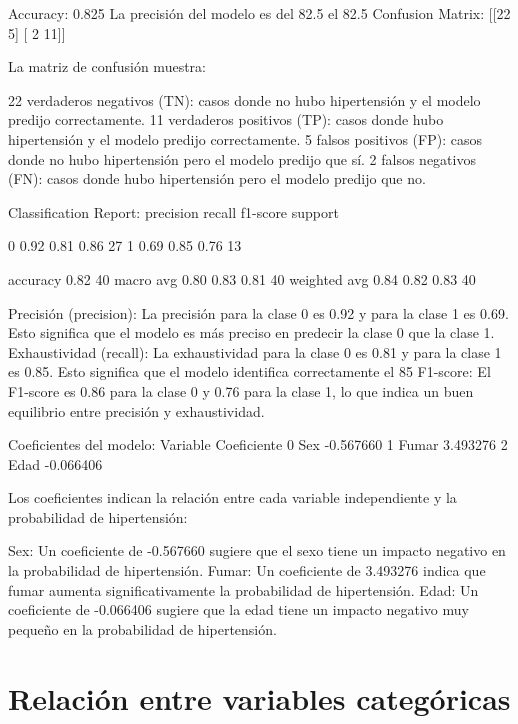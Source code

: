 \documentclass[a4paper, 12pt]{article}
\begin{document}
Accuracy: 0.825
La precisión del modelo es del 82.5%
el 82.5%
Confusion Matrix:
[[22  5]
 [ 2 11]]

La matriz de confusión muestra:

22 verdaderos negativos (TN): casos donde no hubo hipertensión y el modelo predijo correctamente.
11 verdaderos positivos (TP): casos donde hubo hipertensión y el modelo predijo correctamente.
5 falsos positivos (FP): casos donde no hubo hipertensión pero el modelo predijo que sí.
2 falsos negativos (FN): casos donde hubo hipertensión pero el modelo predijo que no.

Classification Report:
              precision    recall  f1-score   support

           0       0.92      0.81      0.86        27
           1       0.69      0.85      0.76        13

    accuracy                           0.82        40
   macro avg       0.80      0.83      0.81        40
weighted avg       0.84      0.82      0.83        40

Precisión (precision): La precisión para la clase 0 es 0.92 y para la clase 1 es 0.69. Esto significa que el modelo es más preciso en predecir la clase 0 que la clase 1.
Exhaustividad (recall): La exhaustividad para la clase 0 es 0.81 y para la clase 1 es 0.85. Esto significa que el modelo identifica correctamente el 85%
F1-score: El F1-score es 0.86 para la clase 0 y 0.76 para la clase 1, lo que indica un buen equilibrio entre precisión y exhaustividad.

Coeficientes del modelo:
  Variable  Coeficiente
0      Sex    -0.567660
1    Fumar     3.493276
2     Edad    -0.066406

Los coeficientes indican la relación entre cada variable independiente y la probabilidad de hipertensión:

Sex: Un coeficiente de -0.567660 sugiere que el sexo tiene un impacto negativo en la probabilidad de hipertensión.
Fumar: Un coeficiente de 3.493276 indica que fumar aumenta significativamente la probabilidad de hipertensión.
Edad: Un coeficiente de -0.066406 sugiere que la edad tiene un impacto negativo muy pequeño en la probabilidad de hipertensión.


\newpage


\section{Relación entre variables categóricas}
\end{document}

